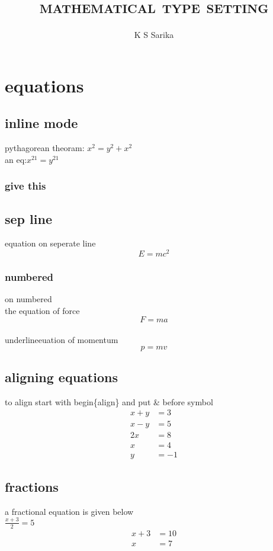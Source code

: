\documentclass[12pt]{book}
\begin{document}
	\title{ \textsc{mathematical type setting}}
	\author{K S Sarika}
	\date{ }
	\maketitle
	\pagestyle{empty}
	
	 \chapter{equations}
		\section*{inline mode}
			pythagorean theoram: $x^2 = y^2 + x^2 $\\
			an eq:$x^{21}=y^{21}$\\
		\subsection*{give this}
		\section*{sep line} equation on seperate line$$ E=mc^2$$
		\subsection{numbered}on numbered\\ the equation of force \begin{equation}F=ma \end{equation} 
		\\underline{euation of momentum}
		\begin{equation}
		p=mv	
		\end{equation}	
		\section*{aligning equations}
		to align start with begin\{align\} and put \& before symbol
		\begin{align*}
			x+y &=3\\
			x-y &=5\\
			2x &=8\\x &=4\\y &=-1		
		\end{align*}	
		\section{fractions}
		a fractional equation is given below\\
		$\frac{x+3}{2}=5$
		\begin{align}
			x+3 &=10 \nonumber \\x &=7
		\end{align}
\end{document}
